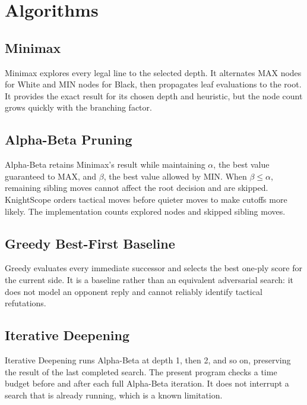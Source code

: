 \documentclass[12pt,a4paper]{report}
\begin{document}
\chapter{Algorithms}
\section{Minimax}
Minimax explores every legal line to the selected depth. It alternates MAX nodes for White and MIN nodes for Black, then propagates leaf evaluations to the root. It provides the exact result for its chosen depth and heuristic, but the node count grows quickly with the branching factor.

\section{Alpha-Beta Pruning}
Alpha-Beta retains Minimax's result while maintaining $\alpha$, the best value guaranteed to MAX, and $\beta$, the best value allowed by MIN. When $\beta\leq\alpha$, remaining sibling moves cannot affect the root decision and are skipped. KnightScope orders tactical moves before quieter moves to make cutoffs more likely. The implementation counts explored nodes and skipped sibling moves.

\section{Greedy Best-First Baseline}
Greedy evaluates every immediate successor and selects the best one-ply score for the current side. It is a baseline rather than an equivalent adversarial search: it does not model an opponent reply and cannot reliably identify tactical refutations.

\section{Iterative Deepening}
Iterative Deepening runs Alpha-Beta at depth 1, then 2, and so on, preserving the result of the last completed search. The present program checks a time budget before and after each full Alpha-Beta iteration. It does not interrupt a search that is already running, which is a known limitation.
\end{document}
